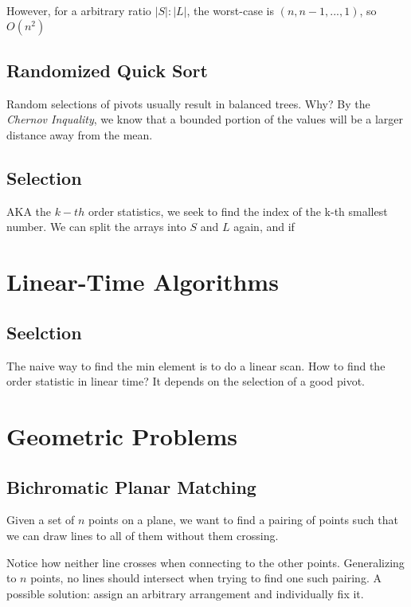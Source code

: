 \documentclass[portrait,10pt, a4paper]{article}
\begin{document}
\begin{multicols*}{3}
		However, for a arbitrary ratio  $|S|:|L|$, the worst-case is $(n,n-1,...,1)$, so $O(n^{2})$
	\subsection{Randomized Quick Sort}
		Random selections of pivots usually result in balanced trees. Why? By the \textit{Chernov Inquality}, we
		know that a bounded portion of the values will be a larger distance away from the mean.
	\subsection{Selection}
		AKA the $k-th$ order statistics, we seek to find the index of the k-th smallest number. We can split
		the arrays into $S$ and $L$ again, and if 
\section{Linear-Time Algorithms}
	\subsection{Seelction}
		The naive way to find the min element is to do a linear scan. How to find the order statistic in linear 
		time? It depends on the selection of a good pivot. 
\section{Geometric Problems}
	\subsection{Bichromatic Planar Matching}
		Given  a set of $n$ points on a plane, we want to find a pairing of points such that we can draw lines 
		to all of them without them crossing.

			
		Notice how neither line crosses when connecting to the other points. Generalizing to $n$ points, no lines
		should intersect when trying to find one such pairing. A possible solution: assign an arbitrary 
		arrangement and individually fix it.

\end{multicols*}
\end{document}
